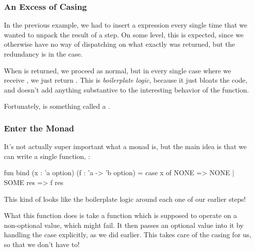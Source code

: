 \documentclass[aspectratio=169, handout]{beamer}
\begin{document}
\begin{frame}[fragile]
  \frametitle{An Excess of Casing}

  In the previous example, we had to insert a  expression every single
  time that we wanted to unpack the result of a step. On some level, this is expected,
  since we otherwise have no way of dispatching on what exactly was returned, but the
  redundancy is in the  case.

  \pause
  \vspace{\fill}

  When  is returned, we proceed as normal, but in every single case where we
  receive , we just return . This is \textit{boilerplate logic},
  because it just bloats the code, and doesn't add anything substantive to the interesting
  behavior of the function.

  \pause
  \vspace{\fill}

  Fortunately,  is something called a .

  \pause
  \vspace{\fill}

\end{frame}

\begin{frame}[fragile]
  \frametitle{Enter the Monad}

  \tgs

  It's not actually super important what a monad is, but the main idea is that we can
  write a single function, :

  \pause
  \begin{codeblock}
    fun bind (x : 'a option) (f : 'a -> 'b option) =
      case x of
        NONE => NONE
      | SOME res => f res
  \end{codeblock}

  \pause
  \vspace{\fill}

  This kind of looks like the boilerplate logic around each one of our earlier steps!

  \pause
  \vspace{\fill}

  What this function does is take a function which is supposed to operate on a non-optional
  value, which might fail. It then passes an optional value into it by handling the
   case explicitly, as we did earlier. This takes care of the casing for us,
  so that we don't have to!
\end{frame}
\end{document}
